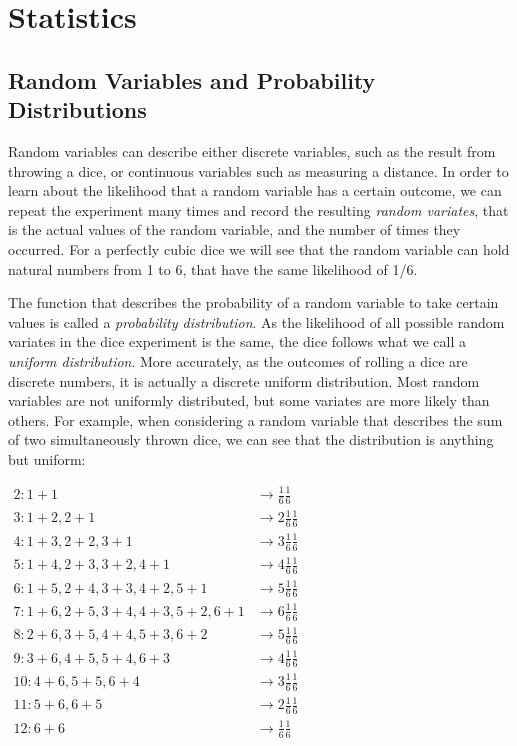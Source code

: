 \chapter{Statistics}\label{chap:statistics}
\section{Random Variables and Probability Distributions}\label{sec:pdfs}
Random variables can describe either discrete variables, such as the result from throwing a dice, or continuous variables such as measuring a distance. In order to learn about the likelihood that a random variable has a certain outcome, we can repeat the experiment many times and record the resulting \emph{random variates}, that is the actual values of the random variable, and the number of times they occurred. For a perfectly cubic dice we will see that the random variable can hold natural numbers from 1 to 6, that have the same likelihood of 1/6.

The function that describes the probability of a random variable to take certain values is called a \emph{probability distribution}.
As the likelihood of all possible random variates in the dice experiment is the same, the dice follows what we call a \emph{uniform distribution}. More accurately, as the outcomes of rolling a dice are discrete numbers, it is actually a discrete uniform distribution. Most random variables are not uniformly distributed, but some variates are more likely than others. For example, when considering a random variable that describes the sum of two simultaneously thrown dice, we can see that the distribution is anything but uniform:

$\begin{array}{ll}
2: 1+1 & \rightarrow \frac{1}{6}\frac{1}{6}\\
3: 1+2, 2+1 &\rightarrow 2\frac{1}{6}\frac{1}{6}\\
4: 1+3, 2+2, 3+1 &\rightarrow 3\frac{1}{6}\frac{1}{6}\\
5: 1+4, 2+3, 3+2, 4+1 & \rightarrow 4\frac{1}{6}\frac{1}{6}\\
6: 1+5, 2+4, 3+3, 4+2, 5+1 & \rightarrow 5\frac{1}{6}\frac{1}{6}\\
7: 1+6, 2+5, 3+4, 4+3, 5+2, 6+1 & \rightarrow 6\frac{1}{6}\frac{1}{6}\\
8: 2+6, 3+5, 4+4, 5+3, 6+2 & \rightarrow 5\frac{1}{6}\frac{1}{6}\\
9: 3+6, 4+5, 5+4, 6+3 & \rightarrow 4\frac{1}{6}\frac{1}{6}\\
10: 4+6, 5+5, 6+4 & \rightarrow 3\frac{1}{6}\frac{1}{6}\\
11: 5+6, 6+5 & \rightarrow 2\frac{1}{6}\frac{1}{6}\\
12: 6+6 & \rightarrow \frac{1}{6}\frac{1}{6}\\
\end{array}$

